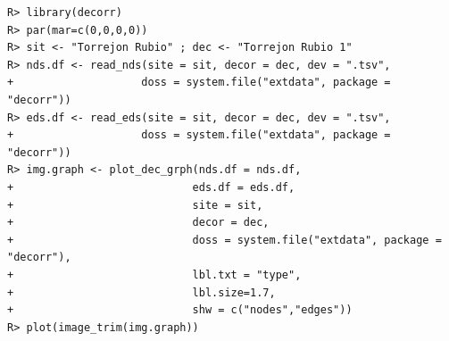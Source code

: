 \documentclass[article]{jss}\usepackage{knitr}
\begin{document}
\begin{kframe}
\begin{verbatim}
R> library(decorr)
R> par(mar=c(0,0,0,0))
R> sit <- "Torrejon Rubio" ; dec <- "Torrejon Rubio 1"
R> nds.df <- read_nds(site = sit, decor = dec, dev = ".tsv",
+                    doss = system.file("extdata", package = "decorr"))
R> eds.df <- read_eds(site = sit, decor = dec, dev = ".tsv",
+                    doss = system.file("extdata", package = "decorr"))
R> img.graph <- plot_dec_grph(nds.df = nds.df,
+                            eds.df = eds.df,
+                            site = sit,
+                            decor = dec,
+                            doss = system.file("extdata", package = "decorr"),
+                            lbl.txt = "type",
+                            lbl.size=1.7,
+                            shw = c("nodes","edges"))
R> plot(image_trim(img.graph))
\end{verbatim}
\end{kframe}\begin{figure}[H]


\end{figure}
\end{document}
